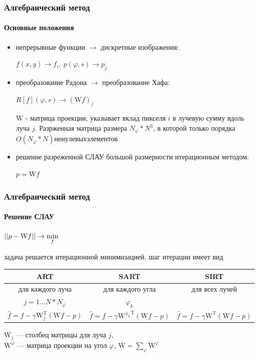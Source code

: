 \documentclass[12pt]{beamer}
\begin{document}
\begin{frame}
\frametitle{Алгебраический метод}
\framesubtitle{Основные положения}
\begin{itemize}
  \item непрерывные функции $\rightarrow$ дискретные изображения:

    {
    \centering
    $f(x,y) \rightarrow f_i,\ p(\varphi, s) \rightarrow p_j$
    \par
    }
  \vspace{0.5cm}
  \item преобразование Радона $\rightarrow$ преобразование Хафа:
  
    {
    \centering
    $R[f](\varphi, s) \rightarrow (\mathrm W f)_j$ 
    \par
    }
  \vspace{0.5cm}

    $\mathrm W$ - матрица проекции, указывает вклад пикселя $i$ в лучевую сумму вдоль луча $j$.
    Разрженная матрица размера $N_\varphi * N^3$, в которой только порядка $O(N_\varphi * N) ненулевых элементов$
    \vspace{1cm}
  \item решение разреженной СЛАУ большой размерности итерационным методом.

    {
    \centering
    $p = \mathrm W f$
    \par
    }

\end{itemize}
\end{frame}

\begin{frame}
\frametitle{Алгебраический метод}
\framesubtitle{Решение СЛАУ}
\centering
$\left|\left| p - \mathrm W f \right|\right| \rightarrow \min\limits_f$

задача решается итерационной минимизацией, шаг итерации имеет вид
\vspace{0.5cm}

\begingroup
\footnotesize

\hspace*{-0.5cm}
\begin{tabular}{c|c|c}
ART & SART & SIRT \\ \hline
для каждого луча & для каждого угла & для всех лучей\\
$j = 1 \dots N * N_\varphi$ & $\varphi_k$ & \\
$\hat{f} = f - \gamma \mathrm W^{\mathrm T}_j(\mathrm W f - p)$ &
$\hat{f} = f - \gamma \mathrm {W^{\varphi_k}}^{\mathrm T}(\mathrm W f - p)$ &
$\hat{f} = f - \gamma \mathrm W^{\mathrm T}(\mathrm W f - p)$ \\
\end{tabular}

\vspace{0.5cm}
\raggedright
\endgroup

$\mathrm W_j$ --- столбец матрицы для луча $j$,\\
$\mathrm W^\varphi$ ---  матрица проекции на угол $\varphi$, $\mathrm W = \sum_\varphi {\mathrm W^\varphi}$


\end{frame}
\end{document}
